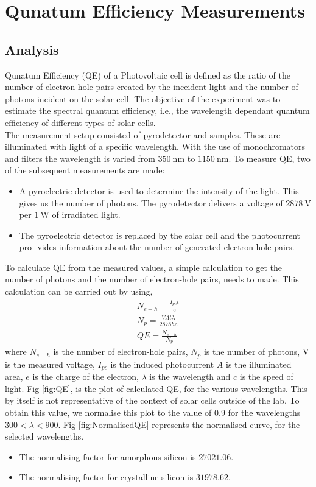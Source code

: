 \section{Qunatum Efficiency Measurements}
\label{sec:Auswertung}

\subsection{Analysis}
Qunatum Efficiency (QE) of a Photovoltaic cell is defined as the ratio of the number of electron-hole pairs
created by the inceident light and the number of photons incident on the solar cell. The objective 
of the experiment was to estimate the spectral quantum efficiency, i.e., the wavelength dependant quantum
efficiency of different types of solar cells. 
\\

The measurement setup consisted of pyrodetector and samples. These are illuminated with light of a specific wavelength. With the use of monochromators and filters 
the wavelength is varied from $350~\si{\nano\meter}$ to $1150~\si{\nano\meter}$. To measure QE, two of the subsequent measurements are made:
\begin{itemize}
    \item A pyroelectric detector is used to determine the intensity of the light. This gives us the number of photons. 
    The pyrodetector delivers a voltage of $2878~\si{\volt}$ per $1~\si{\watt}$ of irradiated light.
    \item The pyroelectric detector is replaced by the solar cell and the photocurrent pro- vides information about the number of generated electron hole pairs.
\end{itemize}

To calculate QE from the measured values, a simple calculation to get the number of photons and the number of electron-hole pairs, needs to made. 
This calculation can be carried out by using, 
\begin{align*}
   N_{e-h} = \frac{I_{pc}t}{e} \\ 
   N_p = \frac{VAt \lambda}{2878 hc} \\ 
   QE = \frac{N_{e-h}}{N_p}
\end{align*}
where $N_{e-h}$ is the number of electron-hole pairs, $N_p$ is the number of photons, V is the measured voltage, $I_{pc}$ is the induced photocurrent
$A$ is the illuminated area, $e$ is the charge of the electron, $\lambda$ is the wavelength and $c$ is the speed of light. 
Fig \ref{fig:QE}, is the plot of calculated QE, for the various wavelengths. This by itself is not representative of the context of solar cells outside 
of the lab. To obtain this value, we normalise this plot to the value of $0.9$ for the wavelengths $300 < \lambda < 900$. 
Fig \ref{fig:NormalisedQE} represents the normalised curve, for the selected wavelengths. 
\begin{itemize}
\item The normalising factor for amorphous silicon is $27021.06$.
\item The normalising factor for crystalline silicon is $31978.62$.
\end{itemize}

